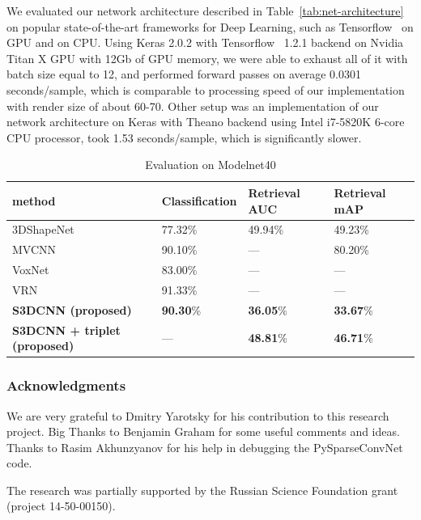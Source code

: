 We evaluated our network architecture described in Table~\ref{tab:net-architecture} on popular state-of-the-art frameworks for Deep Learning, such as Tensorflow~\cite{tensorflow2015-whitepaper} on GPU and \cite{2016arXiv160502688short} on CPU.
Using Keras \cite{chollet2015keras} 2.0.2 with Tensorflow~\cite{tensorflow2015-whitepaper} 1.2.1 backend on Nvidia Titan X GPU with 12Gb of GPU memory, we were able to exhaust all of it with batch size equal to 12, and performed forward passes on average 0.0301 seconds/sample, which is comparable to processing speed of our implementation with render size of about 60-70.
Other setup was an implementation of our network architecture on Keras with Theano backend using Intel i7-5820K 6-core CPU processor, took 1.53 seconds/sample, which is significantly slower.


\begin{table}[t]
  \caption{Evaluation on Modelnet40}
  \label{tab:classification}
  \centering
  \begin{tabular}{llll}
    \toprule
    method & Classification & Retrieval AUC & Retrieval mAP \\
    \midrule
    3DShapeNet \cite{wu20153d} & 77.32\% & 49.94\% & 49.23\% \\
    MVCNN \cite{su15mvcnn} & 90.10\% & --- & 80.20\% \\
    VoxNet \cite{maturana2015voxnet} & 83.00\% & --- & --- \\
    VRN \cite{brock2016generative} & 91.33\% & --- & --- \\
    \textbf{S3DCNN (proposed)} & \textbf{90.30}\% & \textbf{36.05}\% & \textbf{33.67}\% \\
    \textbf{S3DCNN + triplet (proposed)} & --- & \textbf{48.81}\% & \textbf{46.71}\% \\
    \bottomrule
  \end{tabular}
\end{table}

\subsubsection*{Acknowledgments}
We are very grateful to Dmitry Yarotsky for his contribution to this research project. Big Thanks to Benjamin Graham for some useful comments and ideas. Thanks to Rasim Akhunzyanov for his help in debugging the PySparseConvNet code.

The research was partially supported by the Russian Science Foundation grant (project 14-50-00150).